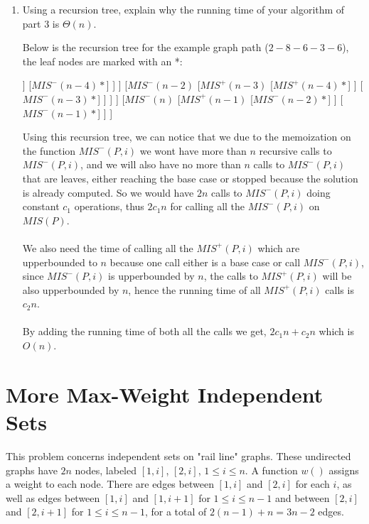 \documentclass[11pt]{article}
\def\question#1{\red{#1}}
\def\soln#1{\par\blu{#1}} %
\def\blu#1{{\color{blu}#1}}
\def\red#1{{\color{red}#1}}
\begin{document}
\begin{enumerate}
\item \question{Using a recursion tree, explain why the running time of your algorithm of part 3 is $\Theta(n)$.}
\soln{
  Below is the recursion tree for the example graph path ($2-8-6-3-6$), the leaf nodes are marked with 
  an *:
  \begin{center}
    \begin{forest}
      [$MIS(n)$
        [$MIS^+(n)$
          [$MIS^-(n-1)$
            [$MIS^+(n-2)$
              [$MIS^-(n-3)$
                [$MIS^+(n-4)$
                  [$MIS^-(n-5)*$]
                ]
                [$MIS^-(n-4)*$]
              ]
            ]
            [$MIS^-(n-2)$
              [$MIS^+(n-3)$
                [$MIS^+(n-4)*$]
              ]
              [$MIS^-(n-3)*$]
            ]
          ]
        ]
        [$MIS^-(n)$
          [$MIS^+(n-1)$
            [$MIS^-(n-2)*$]
          ]
          [$MIS^-(n-1)*$]
        ]
      ]
    \end{forest}
  \end{center}
  Using this recursion tree, we can notice that we due to the memoization on the function $MIS^-(P,i)$
  we wont have more than $n$ recursive calls to $MIS^-(P,i)$, and we will also have no more than 
  $n$ calls to $MIS^-(P,i)$ that are leaves, either reaching the base case or stopped because the 
  solution is already computed. So we would have $2n$ calls to $MIS^-(P,i)$ doing constant $c_1$ operations, 
  thus $2c_1n$ for calling all the $MIS^-(P,i)$ on $MIS(P)$. \\ \\
  We also need the time of calling all the $MIS^+(P,i)$ which are upperbounded to $n$ because one 
  call either is a base case or call $MIS^-(P,i)$, since $MIS^-(P,i)$ is upperbounded by $n$, the 
  calls to $MIS^+(P,i)$ will be also upperbounded by $n$, hence the running time of all 
  $MIS^+(P,i)$ calls is $c_2n$. \\ \\
  By adding the running time of both all the calls we get, $2c_1n + c_2n$ which is $O(n)$.
}
\end{enumerate}

\section{More Max-Weight Independent Sets}
\label{sec-5}
This problem concerns independent sets on "rail line" graphs. These
undirected graphs have $2n$ nodes, labeled $[1,i]$, $[2,i]$, $1 \le i
\le n$. A function $w()$ assigns a weight to each node. There are
edges between $[1,i]$ and $[2,i]$ for each $i$, as well as edges
between $[1,i]$ and $[1,i+1]$ for $1 \le i \le n-1$ and between
$[2,i]$ and $[2,i+1]$ for $1 \le i \le n-1$, for a total of $2(n-1) +
n = 3n-2$ edges.
\end{document}
